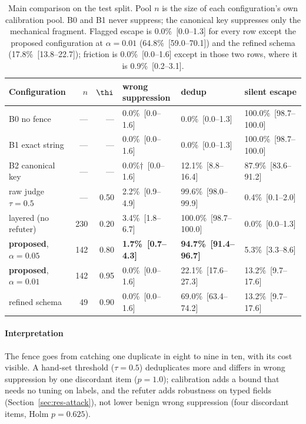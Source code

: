 \begin{table}[!tbp]
\centering\scriptsize\setlength{\tabcolsep}{3.5pt}
\caption{Main comparison on the test split. Pool $n$ is the size of each configuration's own calibration pool. B0 and B1 never suppress; the canonical key suppresses only the mechanical fragment. Flagged escape is 0.0\%~[0.0--1.3] for every row except the proposed configuration at $\alpha=0.01$ (64.8\%~[59.0--70.1]) and the refined schema (17.8\%~[13.8--22.7]); friction is 0.0\%~[0.0--1.6] except in those two rows, where it is 0.9\%~[0.2--3.1].}\label{tab:main}
\begin{tabular}{@{}lrrlll@{}}
\toprule
Configuration & $n$ & $\thi$ & wrong suppression & dedup & silent escape \\
\midrule
B0 no fence & --- & --- & 0.0\%~[0.0--1.6] & 0.0\%~[0.0--1.3] & 100.0\%~[98.7--100.0] \\
B1 exact string & --- & --- & 0.0\%~[0.0--1.6] & 0.0\%~[0.0--1.3] & 100.0\%~[98.7--100.0] \\
B2 canonical key & --- & --- & 0.0\%$\dagger$~[0.0--1.6] & 12.1\%~[8.8--16.4] & 87.9\%~[83.6--91.2] \\
raw judge $\tau=0.5$ & --- & 0.50 & 2.2\%~[0.9--4.9] & 99.6\%~[98.0--99.9] & 0.4\%~[0.1--2.0] \\
layered (no refuter) & 230 & 0.20 & 3.4\%~[1.8--6.7] & 100.0\%~[98.7--100.0] & 0.0\%~[0.0--1.3] \\
\textbf{proposed}, $\alpha=0.05$ & 142 & 0.80 & \textbf{1.7\%~[0.7--4.3]} & \textbf{94.7\%~[91.4--96.7]} & 5.3\%~[3.3--8.6] \\
\textbf{proposed}, $\alpha=0.01$ & 142 & 0.95 & 0.0\%~[0.0--1.6] & 22.1\%~[17.6--27.3] & 13.2\%~[9.7--17.6] \\
refined schema & 49 & 0.90 & 0.0\%~[0.0--1.6] & 69.0\%~[63.4--74.2] & 13.2\%~[9.7--17.6] \\
\bottomrule
\end{tabular}
\end{table}



\paragraph{Interpretation} The fence goes from catching one duplicate in eight to nine in ten, with its cost visible. A hand-set threshold ($\tau=0.5$) deduplicates more and differs in wrong suppression by one discordant item ($p=1.0$); calibration adds a bound that needs no tuning on labels, and the refuter adds robustness on typed fields (Section~\ref{sec:res-attack}), not lower benign wrong suppression (four discordant items, Holm $p=0.625$).

